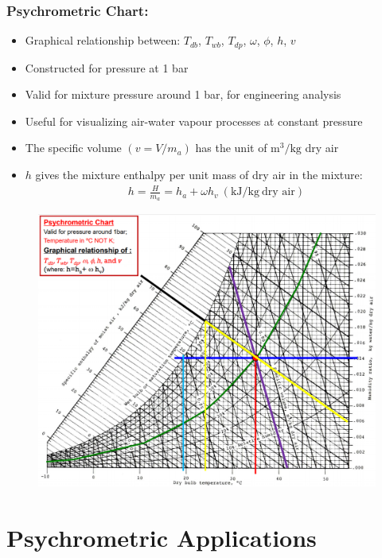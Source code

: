 \documentclass[class=report, crop=false, 12pt,a4paper]{standalone}
\numberwithin{equation}{section}
\begin{document}
\subsubsection{Psychrometric Chart:}
\begin{itemize}[noitemsep]
  \item Graphical relationship between: $T_{db}$, $T_{wb}$, $T_{dp}$, $\omega$, $\phi$, $h$, $v$
  \item Constructed for pressure at 1 bar
  \item Valid for mixture pressure around 1 bar, for engineering analysis
  \item Useful for visualizing air-water vapour processes at constant pressure
  \item The specific volume $(v=V/m_a)$ has the unit of $\si{\metre\cubed\per\kilogram}$ dry air
  \item $h$ gives the mixture enthalpy per unit mass of dry air in the mixture:
  \begin{gather}
    h = \frac{H}{m_a} = h_a + \omega h_v \ (\si{\kilo\joule\per\kilogram} \ \text{dry air})
  \end{gather}
\end{itemize}
\begin{figure}[H]
  \centering
  \includegraphics[width = 0.85 \textwidth]{../img/diagram106.png}
  \caption{}
\end{figure}
\section{Psychrometric Applications}
\end{document}
